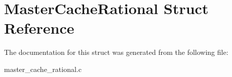 \hypertarget{structMasterCacheRational}{}\section{Master\+Cache\+Rational Struct Reference}
\label{structMasterCacheRational}


The documentation for this struct was generated from the following file\+:\begin{DoxyCompactItemize}
\item 
master\+\_\+cache\+\_\+rational.\+c\end{DoxyCompactItemize}

